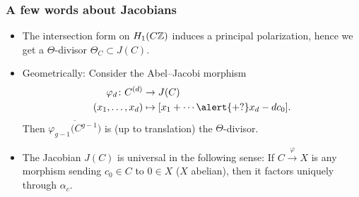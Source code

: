 \begin{frame}
\frametitle{A few words about Jacobians}

\begin{itemize}
	\item The intersection form on $H_1(C\mathbb{Z})$ induces a principal polarization, hence we get a \alert{$\Theta$-divisor} $\Theta_C \subset J(C)$.
	\item Geometrically: Consider the Abel--Jacobi morphism
	\begin{align*}
	\varphi_d\colon C^{(d)} &\to J(C) \\
	(x_1,\ldots,x_d) &\mapsto [x_1+\cdots\alert{+?} x_d-dc_0].
	\end{align*}
	Then $\overline{\varphi_{g-1}\big(C^{g-1}\big)}$ is (up to translation) the $\Theta$-divisor. \pause
	\item The Jacobian $J(C)$ is universal in the following sense: If $C \xrightarrow{\varphi} X$ is any morphism sending $c_0 \in C$ to $0 \in X$ ($X$ abelian), then it factors uniquely through $\alpha_c$.
\end{itemize}
\end{frame}